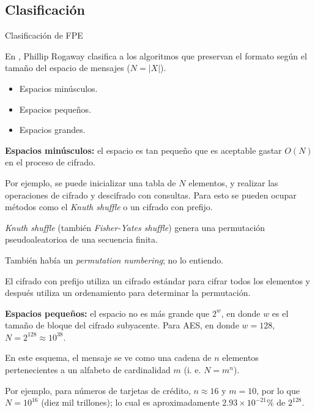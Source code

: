 %
%

\subsection{Clasificación}

\begin{frame}{Clasificación de FPE}

  En \cite{sinopsis_rogaway}, Phillip Rogaway clasifica a los algoritmos que
  preservan el formato según el tamaño del espacio de mensajes ($ N = |X| $).

  \begin{itemize}
    \item Espacios minúsculos.
    \item Espacios pequeños.
    \item Espacios grandes.
  \end{itemize}

  {
    \textbf{Espacios minúsculos:} el espacio es tan pequeño que es aceptable
    gastar $ O(N) $ en el proceso de cifrado.

    Por ejemplo, se puede inicializar una tabla de $ N $ elementos, y realizar
    las operaciones de cifrado y descifrado con consultas. Para esto se pueden
    ocupar métodos como el \textit{Knuth shuffle} o un cifrado con prefijo.
  }

  {
    \textit{Knuth shuffle} (también \textit{Fisher-Yates shuffle}) genera una
    permutación pseudoaleatorioa de una secuencia finita.

    También había un \textit{permutation numbering}; no lo entiendo.

    El cifrado con prefijo utiliza un cifrado estándar para cifrar todos los
    elementos y después utiliza un ordenamiento para determinar la permutación.
  }

  {
    \textbf{Espacios pequeños:} el espacio no es más grande que $ 2^w $, en
    donde $ w $ es el tamaño de bloque del cifrado subyacente. Para AES, en
    donde $ w = 128 $, $ N = 2^{128} \approx 10^{38} $.

    En este esquema, el mensaje se ve como una cadena de $ n $ elementos
    pertenecientes a un alfabeto de cardinalidad $ m $ (i. e. $ N = m^n $).

    Por ejemplo, para números de tarjetas de crédito, $ n \approx 16 $ y
    $ m = 10 $, por lo que $ N = 10^{16} $ (diez mil trillones); lo cual es
    aproximadamente $ 2.93 \times 10^{-21} \% $ de $ 2^{128} $.
  }


\end{frame}
